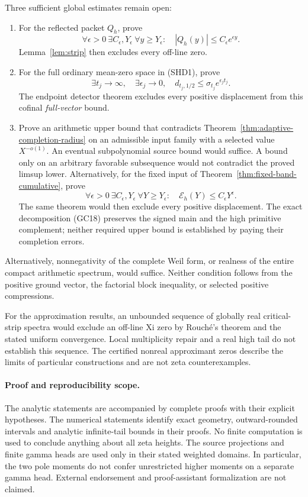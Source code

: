 \documentclass[11pt]{article}
\theoremstyle{remark}\newtheorem{remark}[theorem]{Remark}
\begin{document}
Three sufficient global estimates remain open:
\begin{enumerate}
\item For the reflected packet \(Q_h\), prove
\[
 \forall\epsilon>0\ \exists C_\epsilon,Y_\epsilon\
 \forall y\ge Y_\epsilon:\quad
 |Q_h(y)|\le C_\epsilon e^{\epsilon y}.
\]
Lemma~\ref{lem:strip} then excludes every off-line zero.
\item For the full ordinary mean-zero space in (SHD1), prove
\[
 \exists t_j\to\infty,\quad \exists\epsilon_j\to0,\quad
 d_{t_j,1/2}\le\sigma_{t_j}e^{\epsilon_jt_j}.
\]
The endpoint detector theorem excludes every positive displacement
from this cofinal \emph{full-vector} bound.
\item Prove an arithmetic upper bound that contradicts
Theorem~\ref{thm:adaptive-completion-radius} on an admissible
input family with a selected value \(X^{-o(1)}\).
An eventual subpolynomial source bound would suffice. A bound
only on an arbitrary favorable subsequence would not contradict
the proved limsup lower. Alternatively, for the fixed input of
Theorem~\ref{thm:fixed-band-cumulative}, prove
\[
 \forall\epsilon>0\ \exists C_\epsilon,Y_\epsilon\
 \forall Y\ge Y_\epsilon:\quad
               \mathcal E_h(Y)\le C_\epsilon Y^\epsilon .
\]
The same theorem would then exclude every positive displacement.
The exact decomposition (GC18) preserves the signed main and
the high primitive complement; neither required upper bound
is established by paying their completion errors.
\end{enumerate}
Alternatively, nonnegativity of the complete Weil form, or realness
of the entire compact arithmetic spectrum, would suffice. Neither
condition follows from the positive ground vector, the factorial
block inequality, or selected positive compressions.

For the approximation results, an unbounded sequence of globally
real critical-strip spectra would exclude an off-line Xi zero by
Rouch\'e's theorem and the stated uniform convergence. Local
multiplicity repair and a real high tail do not establish this
sequence. The certified nonreal approximant zeros describe the
limits of particular constructions and are not zeta counterexamples.

\paragraph{Proof and reproducibility scope.}
The analytic statements are accompanied by complete proofs with
their explicit hypotheses. The numerical statements identify exact geometry,
outward-rounded intervals and analytic infinite-tail bounds in
their proofs. No finite computation is used to conclude anything
about all zeta heights. The source projections and finite gamma
heads are used only in their stated weighted domains. In particular,
the two pole moments do not confer unrestricted higher moments
on a separate gamma head. External endorsement and proof-assistant
formalization are not claimed.
\end{document}
